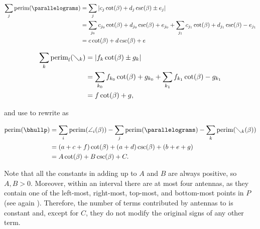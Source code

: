 \documentclass[11pt,letterpaper,english]{article}
\theoremstyle{definition}
\newcommand{\perim}{\operatorname{perim}}
\begin{document}
\begin{align}
  \label{apps:perim:eqn:antenna:4}
  \sum_j \perim(\parallelograms) &= \sum_j \left|
                                   c_j \cot(\beta)
                                   + d_j \csc(\beta)
                                   \pm e_j \right| \nonumber \\
                                 &= \sum_{j_0}
                                   c_{j_0} \cot(\beta) + d_{j_0} \csc(\beta) + e_{j_0}
                                   +  \sum_{j_1}
                                   c_{j_1} \cot(\beta) + d_{j_1} \csc(\beta) - e_{j_1} \nonumber \\
                                 &= c \cot(\beta) + d \csc(\beta) + e
\end{align}

\begin{align}
  \label{apps:perim:eqn:antenna:5}
  \sum_k \perim_l(\diagdown_k) &= \left|
                                 f_k \cot(\beta) \pm g_k
                                 \right| \nonumber \\
                               &= \sum_{k_0}
                                 f_{k_0} \cot(\beta) + g_{k_0} + \sum_{k_1}
                                 f_{k_1} \cot(\beta) - g_{k_1} \nonumber \\
                               &= f \cot(\beta) + g,
 \end{align}

 and use
  to
 rewrite  as

 \begin{align}
   \label{apps:perim:eqn:antenna:6}
   \perim(\bhullp) &= \sum_i \perim(\angle_i(\beta))
                     - \sum_j \perim(\parallelograms)
                     - \sum_k \perim(\diagdown_k(\beta)) \nonumber \\
                   &= \left( a + c + f \right) \cot(\beta)
                     + \left( a + d \right) \csc(\beta)
                     + \left( b + e + g \right) \nonumber \\
                   &= A \cot(\beta) + B \csc(\beta) + C.
 \end{align}

 Note that all the constants in  adding
 up to $A$ and $B$ are always positive, so $A,B > 0$. Moreover, within
 an interval there are at most four antennas, as they contain one of
 the left-most, right-most, top-most, and bottom-most points in $P$
 (see again ). Therefore, the number of
 terms contributed by antennas to  is
 constant and, except for $C$, they do not modify the original signs
 of any other term.
\end{document}
